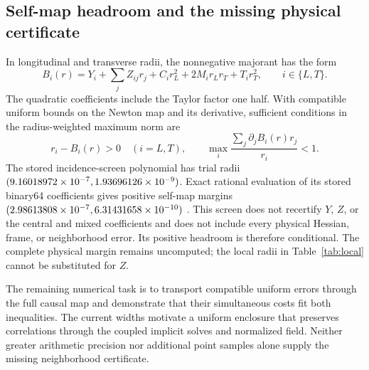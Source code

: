 \documentclass[11pt]{article}
\begin{document}
\subsection{Self-map headroom and the missing physical certificate}
In longitudinal and transverse radii, the nonnegative majorant has the form
\begin{equation}
 B_i(r)=Y_i+\sum_j Z_{ij}r_j+C_i r_L^2+2M_i r_Lr_T+T_i r_T^2,
 \qquad i\in\{L,T\}.
\end{equation}
The quadratic coefficients include the Taylor factor one half. With
compatible uniform bounds on the Newton map and its derivative, sufficient
conditions in the radius-weighted maximum norm are
\begin{equation}
 r_i-B_i(r)>0\quad(i=L,T),\qquad
 \max_i\frac{\sum_j\partial_j B_i(r)r_j}{r_i}<1.
\end{equation}
The stored incidence-screen polynomial has trial radii
\((9.16018972\times10^{-7},1.93696126\times10^{-9})\). Exact rational
evaluation of its stored binary64 coefficients gives positive self-map
margins \((2.98613808\times10^{-7},6.31431658\times10^{-10})\)
\cite{incidencescreen}. This screen does not recertify \(Y\), \(Z\), or
the central and mixed coefficients and does not include every physical
Hessian, frame, or neighborhood error. Its positive headroom is therefore
conditional. The complete physical margin remains uncomputed; the local
radii in Table~\ref{tab:local} cannot be substituted for \(Z\).

The remaining numerical task is to transport compatible uniform errors
through the full causal map and demonstrate that their simultaneous costs
fit both inequalities. The current widths motivate a uniform enclosure that
preserves correlations through the coupled implicit solves and normalized
field. Neither greater arithmetic precision nor additional point samples
alone supply the missing neighborhood certificate.
\end{document}
